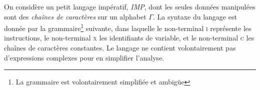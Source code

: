 
\begingroup


\begin{exercice}\label{exercice:IMPtoMT}

  On considère un petit langage impératif, \emph{IMP}, dont les seules données manipulées sont des \emph{chaînes de caractères} sur un alphabet $\Gamma$.
  La syntaxe du langage est donnée par la grammaire\footnote{La grammaire est volontairement simplifiée et ambigüe} suivante,
  dans laquelle le non-terminal \textsc{i} représente les instructions,
  le non-terminal \textsc{x} les identifiants de variable,
  et le non-terminal \textsc{c} les chaînes de caractères constantes.
  Le langage ne contient volontairement pas d'expressions complexes pour en simplifier l'analyse. 
  

\end{exercice}
